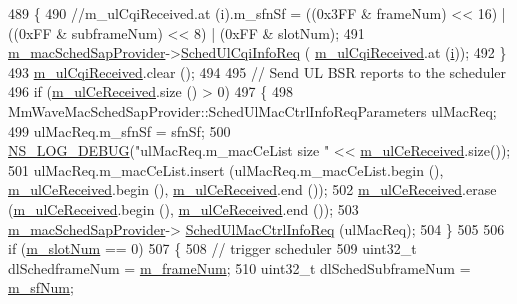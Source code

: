 \begin{DoxyCode}
489         \{
490                 \textcolor{comment}{//m\_ulCqiReceived.at (i).m\_sfnSf = ((0x3FF & frameNum) << 16) | ((0xFF & subframeNum) << 8)
       | (0xFF & slotNum);}
491                 \hyperlink{classns3_1_1MmWaveEnbMac_a3df504a631404f94bee271abdca7bd88}{m\_macSchedSapProvider}->\hyperlink{classns3_1_1MmWaveMacSchedSapProvider_a08a0cd027561ff8f4b8a1608cef7f493}{SchedUlCqiInfoReq} (
      \hyperlink{classns3_1_1MmWaveEnbMac_aaea2d5b20bbd7a5827bebd0c6b782e7c}{m\_ulCqiReceived}.at (\hyperlink{bernuolliDistribution_8m_a6f6ccfcf58b31cb6412107d9d5281426}{i}));
492         \}
493         \hyperlink{classns3_1_1MmWaveEnbMac_aaea2d5b20bbd7a5827bebd0c6b782e7c}{m\_ulCqiReceived}.clear ();
494 
495         \textcolor{comment}{// Send UL BSR reports to the scheduler}
496         \textcolor{keywordflow}{if} (\hyperlink{classns3_1_1MmWaveEnbMac_a7046f8a9936884f8d38e139a33db01a4}{m\_ulCeReceived}.size () > 0)
497         \{
498                 MmWaveMacSchedSapProvider::SchedUlMacCtrlInfoReqParameters ulMacReq;
499                 ulMacReq.m\_sfnSf = sfnSf;
500                 \hyperlink{group__logging_ga413f1886406d49f59a6a0a89b77b4d0a}{NS\_LOG\_DEBUG}(\textcolor{stringliteral}{"ulMacReq.m\_macCeList size "} << 
      \hyperlink{classns3_1_1MmWaveEnbMac_a7046f8a9936884f8d38e139a33db01a4}{m\_ulCeReceived}.size());
501                 ulMacReq.m\_macCeList.insert (ulMacReq.m\_macCeList.begin (), 
      \hyperlink{classns3_1_1MmWaveEnbMac_a7046f8a9936884f8d38e139a33db01a4}{m\_ulCeReceived}.begin (), \hyperlink{classns3_1_1MmWaveEnbMac_a7046f8a9936884f8d38e139a33db01a4}{m\_ulCeReceived}.end ());
502                 \hyperlink{classns3_1_1MmWaveEnbMac_a7046f8a9936884f8d38e139a33db01a4}{m\_ulCeReceived}.erase (\hyperlink{classns3_1_1MmWaveEnbMac_a7046f8a9936884f8d38e139a33db01a4}{m\_ulCeReceived}.begin (), 
      \hyperlink{classns3_1_1MmWaveEnbMac_a7046f8a9936884f8d38e139a33db01a4}{m\_ulCeReceived}.end ());
503                 \hyperlink{classns3_1_1MmWaveEnbMac_a3df504a631404f94bee271abdca7bd88}{m\_macSchedSapProvider}->
      \hyperlink{classns3_1_1MmWaveMacSchedSapProvider_ae5d5e3e266a5ca6177960882e996a48b}{SchedUlMacCtrlInfoReq} (ulMacReq);
504         \}
505 
506         \textcolor{keywordflow}{if} (\hyperlink{classns3_1_1MmWaveEnbMac_a8c36f3e08fd6bb1908ff5b1b5c6917a9}{m\_slotNum} == 0)
507         \{
508                 \textcolor{comment}{// trigger scheduler}
509                 uint32\_t dlSchedframeNum = \hyperlink{classns3_1_1MmWaveEnbMac_a13df2d8bc521ce1f72b6b326b852c6d7}{m\_frameNum};
510                 uint32\_t dlSchedSubframeNum = \hyperlink{classns3_1_1MmWaveEnbMac_a04ec543b367c36d292077fa91168894b}{m\_sfNum};

\end{DoxyCode}
